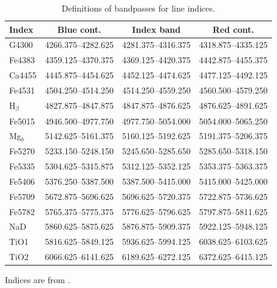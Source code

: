 		\begin{table}
			\centering
		\begin{threeparttable}
			\caption{Definitions of bandpasses for line indices.}
			\label{tab:abIndex}
			\begin{tabular}{l c c c}
				\hline
				\hline
				Index 	& Blue cont. 		& Index band 		& Red cont. \\
				\hline 
				G4300 	& 4266.375--4282.625 & 4281.375--4316.375 & 4318.875--4335.125 \\
				Fe4383 	& 4359.125--4370.375 & 4369.125--4420.375 & 4442.875--4455.375 \\
				Ca4455 	& 4445.875--4454.625 & 4452.125--4474.625 & 4477.125--4492.125 \\
				Fe4531 	& 4504.250--4514.250 & 4514.250--4559.250 & 4560.500--4579.250 \\
				H$_\beta$ & 4827.875--4847.875 & 4847.875--4876.625 & 4876.625--4891.625 \\
				Fe5015 	& 4946.500--4977.750 & 4977.750--5054.000 & 5054.000--5065.250 \\
				Mg$_b$ 	& 5142.625--5161.375 & 5160.125--5192.625 & 5191.375--5206.375 \\
				Fe5270 	& 5233.150--5248.150 & 5245.650--5285.650 & 5285.650--5318.150 \\
				Fe5335 	& 5304.625--5315.875 & 5312.125--5352.125 & 5353.375--5363.375 \\
				Fe5406 	& 5376.250--5387.500 & 5387.500--5415.000 & 5415.000--5425.000 \\
				Fe5709 	& 5672.875--5696.625 & 5696.625--5720.375 & 5722.875--5736.625 \\
				Fe5782 	& 5765.375--5775.375 & 5776.625--5796.625 & 5797.875--5811.625 \\
				NaD 	& 5860.625--5875.625 & 5876.875--5909.375 & 5922.125--5948.125 \\
				TiO1 	& 5816.625--5849.125 & 5936.625--5994.125 & 6038.625--6103.625 \\
				TiO2 	& 6066.625--6141.625 & 6189.625--6272.125 & 6372.625--6415.125 \\
				\hline
				\hline
			\end{tabular}
			\begin{tablenotes}
			\footnotesize
			\item Indices are from \citet{Trager1998}.
			\end{tablenotes}
		\end{threeparttable}
		\end{table}

